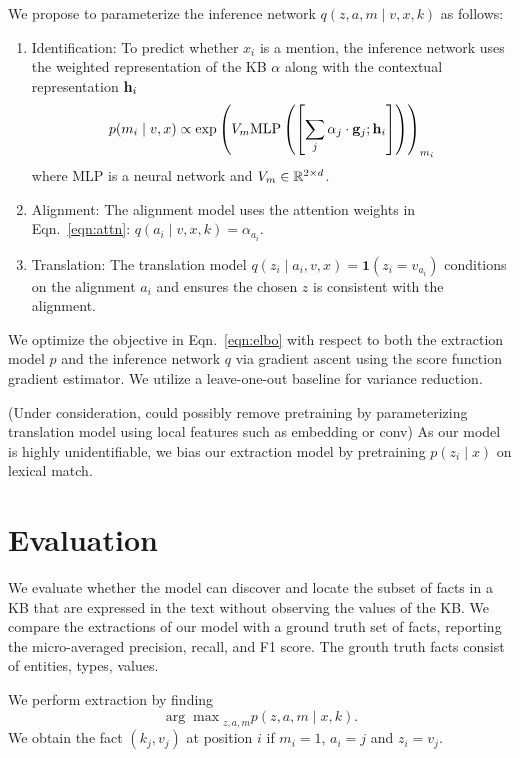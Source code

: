\documentclass[12pt]{article}
\begin{document}
We propose to parameterize the inference network $q(z,a,m\mid v,x,k)$ as follows:
\begin{enumerate}
\item Identification: To predict whether $x_i$ is a mention,
    the inference network uses the weighted representation of the KB $\alpha$
    along with the contextual representation $\mathbf{h}_i$
    \begin{equation}
    p(m_i \mid v,x) \propto
    \exp\left(V_m
    \textrm{MLP}\left(\left[\sum_j \alpha_j \cdot \mathbf{g}_j; \mathbf{h}_i\right]\right)\right)_{m_i}
    \end{equation}
    where MLP is a neural network and $V_m \in \mathbb{R}^{2 \times d}$.
\item Alignment: The alignment model uses the attention weights in Eqn.~\ref{eqn:attn}:
    $q(a_i \mid v,x,k) = \alpha_{a_i}$.
\item Translation: The translation model
    $q(z_i \mid a_i,v,x) = \mathbf{1}(z_i = v_{a_i})$
    conditions on the alignment $a_i$ and ensures the chosen $z$ is consistent
    with the alignment. 
\end{enumerate}

We optimize the objective in Eqn.~\ref{eqn:elbo}
with respect to both the extraction model $p$ and the inference network $q$
via gradient ascent using the score function gradient estimator.
We utilize a leave-one-out baseline for variance reduction.

(Under consideration, could possibly remove pretraining by parameterizing translation
model using local features such as embedding or conv)
As our model is highly unidentifiable,
we bias our extraction model by pretraining $p(z_i \mid x)$ on lexical match.

\section{Evaluation}
We evaluate whether the model can discover
and locate the subset of facts in a KB that are expressed in the text
without observing the values of the KB.
We compare the extractions of our model with a ground truth set of facts,
reporting the micro-averaged precision, recall, and F1 score.
The grouth truth facts consist of entities, types, values.

We perform extraction by finding
$${\arg\max}_{z,a,m} p(z,a,m\mid x,k).$$
We obtain the fact $(k_j, v_j)$ at position $i$ if $m_i=1$,
$a_i = j$ and $z_i = v_j$.
\end{document}
